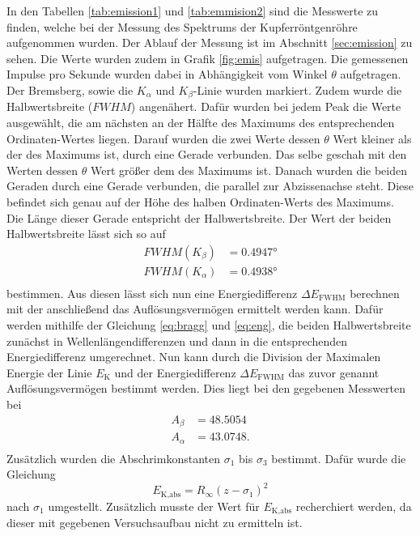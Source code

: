 In den Tabellen \ref{tab:emission1} und \ref{tab:emmision2} sind die Messwerte zu finden, welche bei der Messung des Spektrums der Kupferröntgenröhre aufgenommen wurden.
Der Ablauf der Messung ist im Abschnitt \ref{sec:emission} zu sehen.
Die Werte wurden zudem in Grafik \ref{fig:emis} aufgetragen.
Die gemessenen Impulse pro Sekunde wurden dabei in Abhängigkeit vom Winkel $\theta$ aufgetragen.
Der Bremsberg, sowie die $K_\alpha$ und $K_\beta$-Linie wurden markiert.
Zudem wurde die Halbwertsbreite ($FWHM$) angenähert.
Dafür wurden bei jedem Peak die Werte ausgewählt, die am nächsten an der Hälfte des Maximums des entsprechenden Ordinaten-Wertes liegen.
Darauf wurden die zwei Werte dessen $\theta$ Wert kleiner als der des Maximums ist, durch eine Gerade verbunden.
Das selbe geschah mit den Werten dessen $\theta$ Wert größer dem des Maximums ist.
Danach wurden die beiden Geraden durch eine Gerade verbunden, die parallel zur Abzissenachse steht.
Diese befindet sich genau auf der Höhe des halben Ordinaten-Werts des Maximums.
Die Länge dieser Gerade entspricht der Halbwertsbreite.
Der Wert der beiden Halbwertsbreite lässt sich so auf
\begin{align*}
    FWHM(K_\beta) &=  0.4947 \si{\degree} \\
    FWHM(K_\alpha) &=  0.4938 \si{\degree} \\
\end{align*}
bestimmen.
Aus diesen lässt sich nun eine Energiedifferenz $\Delta E_\text{FWHM}$ berechnen mit der anschließend das Auflösungsvermögen ermittelt werden kann.
Dafür werden mithilfe der Gleichung \eqref{eq:bragg} und \eqref{eq:eng}, die beiden Halbwertsbreite zunächst in Wellenlängendifferenzen und dann in die entsprechenden Energiedifferenz umgerechnet.
Nun kann durch die Division der Maximalen Energie der Linie $E_\text{K}$ und der Energiedifferenz $\Delta E_\text{FWHM}$ das zuvor genannt Auflösungsvermögen bestimmt werden.
Dies liegt bei den gegebenen Messwerten bei 
\begin{align*}
    A_\beta &= 48.5054 \\
    A_\alpha &=  43.0748. \\
\end{align*}
Zusätzlich wurden die Abschrimkonstanten $\sigma_1$ bis $\sigma_3$ bestimmt.
Dafür wurde die Gleichung
\begin{equation*}
  E_\text{K,abs} = R_\infty (z-\sigma_1)^2
  \label{eq:sigma1}
\end{equation*}
nach $\sigma_1$ umgestellt.
Zusätzlich musste der Wert für $E_\text{K,abs}$ recherchiert werden, da dieser mit gegebenen Versuchsaufbau nicht zu ermitteln ist.
